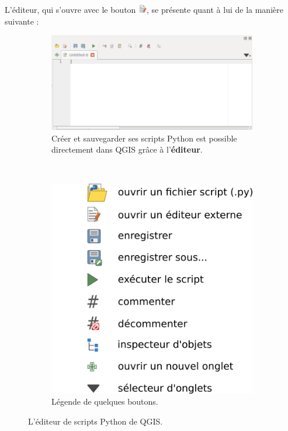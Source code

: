 \documentclass[11pt]{article}
\begin{document}
\newpage{}
L'éditeur, qui s'ouvre avec le bouton \includegraphics[width=1em]{iconShowEditorConsole.png}, se présente quant à lui de la manière suivante :

\begin{figure}[H]
    \centering
    \begin{subfigure}[t]{0.70\textwidth}
		
        \includegraphics[width=1\textwidth]{python_editor_qgis3.png}
\caption{Créer et sauvegarder ses scripts Python est possible directement dans QGIS grâce à l'\textbf{éditeur}.}\label{fig2:consolepython}
    \end{subfigure}%
    ~
    \begin{subfigure}[t]{0.32\textwidth}
        \hspace*{-1em}
        \includegraphics[width=1\textwidth]{drawing_editor.png}
        \caption{Légende de quelques boutons.}\label{fig2:icons}
    \end{subfigure}
    \label{fig2}
    \caption{L'éditeur de scripts Python de QGIS.}
\end{figure}
\end{document}
